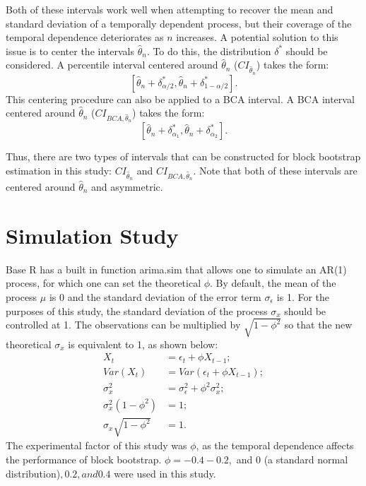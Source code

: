 \documentclass[12pt, letterpaper, titlepage]{article}
\begin{document}
	
Both of these intervals work well when attempting to recover the mean and
standard deviation of a temporally dependent process, but their coverage of
the temporal dependence deteriorates as $n$ increases. A potential solution to
this issue is to center the intervals $\hat{\theta}_{n}$. To do this, the
distribution $\delta^*$ should be considered. A percentile interval centered
around $\hat{\theta}_{n}$ ($CI_{\hat{\theta}_{n}}$) takes the form:
\[ [\hat{\theta}_{n} + \delta^*_{\alpha/2},
  \hat{\theta}_{n} + \delta^*_{1 - \alpha/2}].\] 
This centering procedure can also be applied to a BCA interval. A BCA interval
centered around $\hat{\theta}_{n}$ ($CI_{BCA, \hat{\theta}_{n}}$) takes the
form:
\[ [\hat{\theta}_{n} + \delta^*_{\alpha_1},
  \hat{\theta}_{n} + \delta^*_{\alpha_2}].\] 


Thus, there are two types of intervals that can be constructed for block
bootstrap estimation in this study: $CI_{\hat{\theta}_{n}}$ and
$CI_{BCA, \hat{\theta}_{n}}$. Note that both of these intervals are centered
around $\hat{\theta}_{n}$ and asymmetric. 


\section{Simulation Study}
\label{sec:simstudy}
 
Base R has a built in function arima.sim that allows one to simulate an AR(1)
process, for which one can set the theoretical $\phi$. By default, the mean of
the process $\mu$ is 0 and the standard deviation of the error term
$\sigma_{\epsilon}$ is 1. For the purposes of this study, the standard
deviation of the process $\sigma_{x}$ should be controlled at 1. The
observations can be multiplied by $\sqrt{1 - \phi^2}$ so that the new
theoretical $\sigma_{x}$ is equivalent to 1, as shown below:
\begin{align}
X_{t} &= \epsilon_{t} + \phi X_{t-1};\\
Var(X_{t}) &= Var(\epsilon_{t} + \phi X_{t-1});\\
\sigma^2_{x} &= \sigma^2_{\epsilon} + \phi^2 \sigma^2_{x};\\
\sigma^2_{x}(1 - \phi^2) &= 1;\\
\sigma_{x}\sqrt{1 - \phi^2} &= 1.
\end{align}
The experimental factor of this study was $\phi$, as the temporal dependence
affects the performance of block bootstrap. $\phi = -0.4 -0.2,$ and $0$ (a
standard normal distribution)$, 0.2, and 0.4$ were used in this study. 
\end{document}
